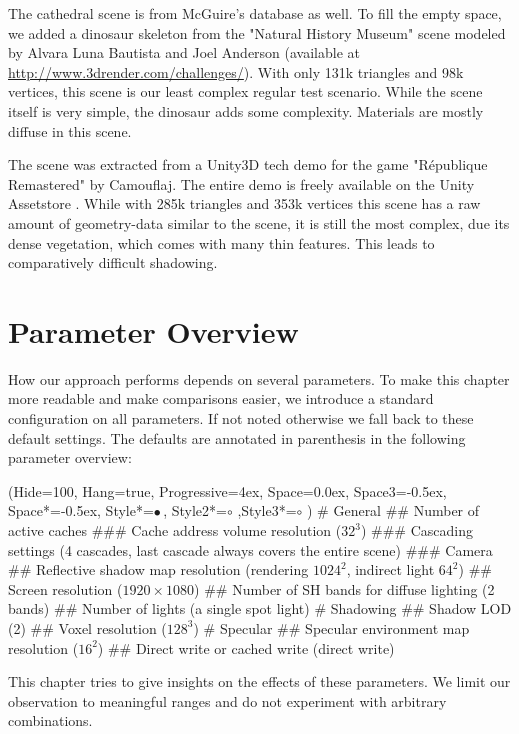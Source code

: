 \documentclass[thesis.tex]{subfiles}
\begin{document}
The  cathedral scene is from McGuire's database \cite{bib:McGuire2011Data} as well.
To fill the empty space, we added a dinosaur skeleton from the "Natural History Museum" scene modeled by Alvara Luna Bautista and Joel Anderson (available at \url{http://www.3drender.com/challenges/}).
With only 131k triangles and 98k vertices, this scene is our least complex regular test scenario.
While the scene itself is very simple, the dinosaur adds some complexity.
Materials are mostly diffuse in this scene.

The  scene was extracted from a Unity3D tech demo for the game "République Remastered" by Camouflaj.
The entire demo is freely available on the Unity Assetstore \cite{bib:republique}.
While with 285k triangles and 353k vertices this scene has a raw amount of geometry-data similar to the  scene, it is still the most complex, due its dense vegetation, which comes with many thin features.
This leads to comparatively difficult shadowing.

\section{Parameter Overview} \label{sec:eva:params}
How our approach performs depends on several parameters.
To make this chapter more readable and make comparisons easier, we introduce a standard configuration on all parameters.
If not noted otherwise we fall back to these default settings.
The defaults are annotated in parenthesis in the following parameter overview:
\begin{easylist}
\ListProperties(Hide=100, Hang=true, Progressive=4ex, Space=0.0ex, Space3=-0.5ex, Space*=-0.5ex, Style*=$\bullet\,$,
Style2*=$\circ$ ,Style3*=$\circ$ )
# General
## Number of active caches
### Cache address volume resolution ($32^3$)
### Cascading settings (4 cascades, last cascade always covers the entire scene)
### Camera
## Reflective shadow map resolution (rendering $1024^2$, indirect light $64^2$)
## Screen resolution ($1920\times1080$)
## Number of SH bands for diffuse lighting (2 bands)
## Number of lights (a single spot light)
# Shadowing
## Shadow LOD (2)
## Voxel resolution ($128^3$)
# Specular
## Specular environment map resolution ($16^2$)
## Direct write or cached write (direct write)
\end{easylist}
This chapter tries to give insights on the effects of these parameters.
We limit our observation to meaningful ranges and do not experiment with arbitrary combinations.
\end{document}
